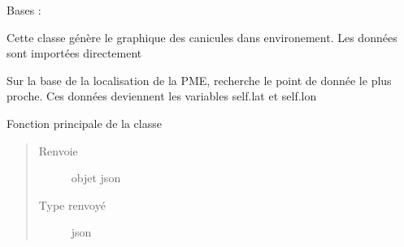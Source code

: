 \documentclass[letterpaper,10pt,french]{sphinxmanual}
\begin{document}

\begin{fulllineitems}
\label{\detokenize{app.home.content_gen:app.home.content_gen.graph_generation.CaniculePlot}}
\sphinxAtStartPar
Bases : 

\sphinxAtStartPar
Cette classe génère le graphique des canicules dans environement.
Les données sont importées directement

\begin{fulllineitems}
\label{\detokenize{app.home.content_gen:app.home.content_gen.graph_generation.CaniculePlot.find_closest}}
\sphinxAtStartPar
Sur la base de la localisation de la PME, recherche le point de donnée le plus proche.
Ces données deviennent les variables self.lat et self.lon

\end{fulllineitems}


\begin{fulllineitems}
\label{\detokenize{app.home.content_gen:app.home.content_gen.graph_generation.CaniculePlot.main}}
\sphinxAtStartPar
Fonction principale de la classe
\begin{quote}\begin{description}
\item[{Renvoie}] \leavevmode
\sphinxAtStartPar
objet json

\item[{Type renvoyé}] \leavevmode
\sphinxAtStartPar
json

\end{description}\end{quote}

\end{fulllineitems}


\end{fulllineitems}
\end{document}
